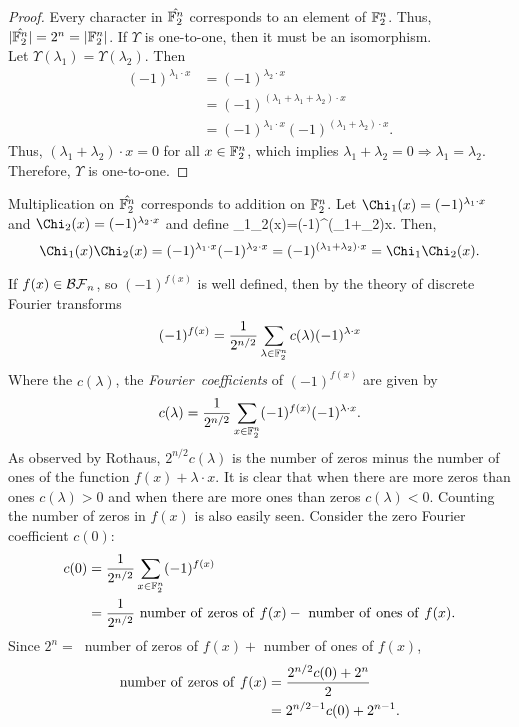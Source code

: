 \begin{proof}
	Every character in $\hat{\mathbb{F}_2^n}$ corresponds to an element of $\mathbb{F}_2^n$. Thus,
	$\lvert\hat{\mathbb{F}_2^n}\rvert=2^n=\lvert\mathbb{F}_2^n\rvert$. If $\Upsilon$ is one-to-one, then
	it must be an isomorphism.\\
	Let $\Upsilon(\lambda_1)=\Upsilon(\lambda_2)$. Then
	\begin{align*}
		(-1)^{\lambda_1\cdot x}&=(-1)^{\lambda_2\cdot x}\\
		                       &=(-1)^{(\lambda_1+\lambda_1+\lambda_2)\cdot x}\\
													 &=(-1)^{\lambda_1\cdot x}(-1)^{(\lambda_1+\lambda_2)\cdot x}.
	\end{align*}
	Thus, $(\lambda_1+\lambda_2)\cdot x=0$ for all $x\in\mathbb{F}_2^n$, which implies
	$\lambda_1+\lambda_2=0\Rightarrow\lambda_1=\lambda_2$. Therefore, $\Upsilon$ is
	one-to-one.
\end{proof}

\par Multiplication on $\hat{\mathbb{F}_2^n}$ corresponds to addition on $\mathbb{F}_2^n$. Let
$\Chi_1(x)=(-1)^{\lambda_1\cdot x}$ and $\Chi_2(x)=(-1)^{\lambda_2\cdot x}$ and define
\Chi_1\Chi_2(x)=(-1)^{(\lambda_1+\lambda_2)\cdot x}. Then,
\[
\Chi_1(x)\Chi_2(x)=(-1)^{\lambda_1\cdot x}(-1)^{\lambda_2\cdot x}=(-1)^{(\lambda_1+\lambda_2)\cdot x}=\Chi_1\Chi_2(x).
\]




\par If $f(x)\in\mathcal{BF}_n$, so $(-1)^{f(x)}$ is well defined, then by the
theory of discrete Fourier transforms
\begin{equation}\label{eqn:DFT}
  (-1)^{f(x)}=\frac{1}{2^{n/2}}\sum_{\lambda\in\mathbb{F}_2^n}c(\lambda)(-1)^{\lambda\cdot x}
\end{equation}
Where the $c(\lambda)$, the {\em Fourier\ coefficients} of $(-1)^{f(x)}$ are given by
\[
  c(\lambda)=\frac{1}{2^{n/2}}\sum_{x\in\mathbb{F}_2^n}(-1)^{f(x)}(-1)^{\lambda\cdot x}.
\]
As observed by Rothaus, $2^{n/2}c(\lambda)$ is the number of zeros minus the number
of ones of the function $f(x)+\lambda\cdot x$. It is clear that when there are more
zeros than ones $c(\lambda)>0$ and when there are more ones than zeros $c(\lambda)<0$.
Counting the number of zeros in $f(x)$ is also easily seen. Consider the zero Fourier
coefficient $c(0)$:
\begin{align*}
	c(0)&=\frac{1}{2^{n/2}}\sum_{x\in\gftwo^n}(-1)^{f(x)}\\
	&=\frac{1}{2^{n/2}}{\rm \ number\ of\ zeros\ of\ }f(x)-{\rm \ number\ of \ ones\ of \ }f(x).
\end{align*}
Since $2^n=\ $ number of zeros of $f(x)+$ number of ones of $f(x)$,
\begin{align*}
	{\rm number\ of\ zeros\ of\ }f(x)&=\frac{2^{n/2}c(0)+2^n}{2}\\
	                                 &=2^{n/2-1}c(0)+2^{n-1}.
\end{align*}


